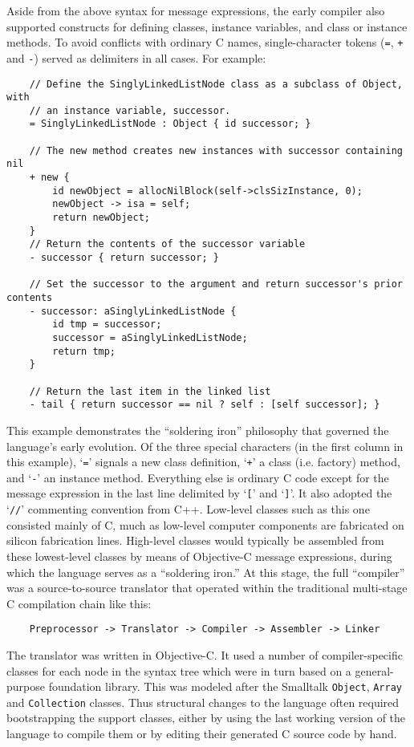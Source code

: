 \documentclass[acmsmall]{acmart}\settopmatter{}
\begin{document}
Aside from the above syntax for message expressions, the early compiler also supported constructs for defining classes, instance variables, and class or instance methods. To avoid conflicts with ordinary C names, single-character tokens (\verb|=|, \verb|+| and \verb|-|) served as delimiters in all cases. For example:
\begin{verbatim}
    // Define the SinglyLinkedListNode class as a subclass of Object, with 
    // an instance variable, successor.
    = SinglyLinkedListNode : Object { id successor; }

    // The new method creates new instances with successor containing nil
    + new {
        id newObject = allocNilBlock(self->clsSizInstance, 0);
        newObject -> isa = self;
        return newObject;
    }
    // Return the contents of the successor variable
    - successor { return successor; }

    // Set the successor to the argument and return successor's prior contents
    - successor: aSinglyLinkedListNode {
        id tmp = successor;
        successor = aSinglyLinkedListNode;
        return tmp;
    }

    // Return the last item in the linked list
    - tail { return successor == nil ? self : [self successor]; }
\end{verbatim}
This example demonstrates the ``soldering iron'' philosophy that governed the language's early evolution. Of the three special characters (in the first column in this example), `\verb|=|' signals a new class definition, `\verb|+|' a class (i.e. factory) method, and `\verb|-|' an instance method. Everything else is ordinary C code except for the message expression in the last line delimited by `\verb|[|' and `\verb|]|'. It also adopted the `\verb|//|' commenting convention from C++. Low-level classes such as this one consisted mainly of C, much as low-level computer components are fabricated on silicon fabrication lines. High-level classes would typically be assembled from these lowest-level classes by means of Objective-C message expressions, during which the language serves as a ``soldering iron.''
At this stage, the full ``compiler'' was a source-to-source translator that operated within the traditional multi-stage C compilation chain like this:
\begin{verbatim}
    Preprocessor -> Translator -> Compiler -> Assembler -> Linker
\end{verbatim}
The translator was written in Objective-C. It used a number of compiler-specific classes for each node in the syntax tree which were in turn based on a general-purpose foundation library. This was modeled after the Smalltalk \verb|Object|, \verb|Array| and \verb|Collection| classes. Thus structural changes to the language often required bootstrapping the support classes, either by using the last working version of the language to compile them or by editing their generated C source code by hand.
\end{document}
